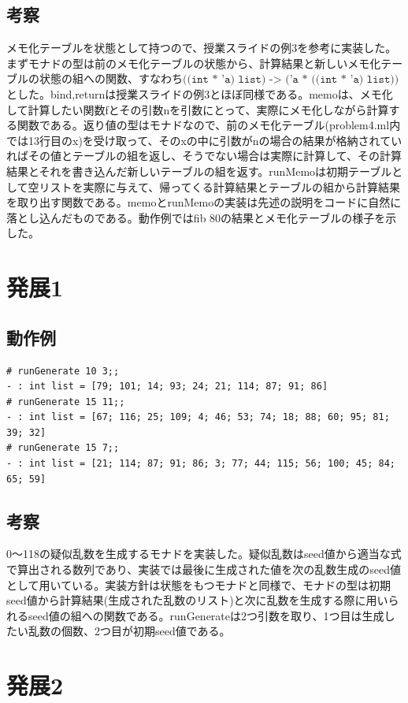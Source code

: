 \documentclass[11pt,a4paper]{jsarticle}
\begin{document}
\subsection*{考察}
メモ化テーブルを状態として持つので、授業スライドの例3を参考に実装した。
まずモナドの型は前のメモ化テーブルの状態から、計算結果と新しいメモ化テーブルの状態の組への関数、すなわち$\texttt{((int * 'a) list) -> ('a * ((int * 'a) list))}$とした。bind,returnは授業スライドの例3とほぼ同様である。memoは、メモ化して計算したい関数fとその引数nを引数にとって、実際にメモ化しながら計算する関数である。返り値の型はモナドなので、前のメモ化テーブル(problem4.ml内では13行目のx)を受け取って、そのxの中に引数がnの場合の結果が格納されていればその値とテーブルの組を返し、そうでない場合は実際に計算して、その計算結果とそれを書き込んだ新しいテーブルの組を返す。runMemoは初期テーブルとして空リストを実際に与えて、帰ってくる計算結果とテーブルの組から計算結果を取り出す関数である。memoとrunMemoの実装は先述の説明をコードに自然に落とし込んだものである。動作例ではfib 80の結果とメモ化テーブルの様子を示した。
\section*{発展1}
\subsection*{動作例}
\begin{lstlisting}[basicstyle=\ttfamily\footnotesize, frame=single]
# runGenerate 10 3;;
- : int list = [79; 101; 14; 93; 24; 21; 114; 87; 91; 86]
# runGenerate 15 11;;
- : int list = [67; 116; 25; 109; 4; 46; 53; 74; 18; 88; 60; 95; 81; 39; 32]
# runGenerate 15 7;;
- : int list = [21; 114; 87; 91; 86; 3; 77; 44; 115; 56; 100; 45; 84; 65; 59]
\end{lstlisting}
\subsection*{考察}
0〜118の疑似乱数を生成するモナドを実装した。疑似乱数はseed値から適当な式で算出される数列であり、実装では最後に生成された値を次の乱数生成のseed値として用いている。実装方針は状態をもつモナドと同様で、モナドの型は初期seed値から計算結果(生成された乱数のリスト)と次に乱数を生成する際に用いられるseed値の組への関数である。runGenerateは2つ引数を取り、1つ目は生成したい乱数の個数、2つ目が初期seed値である。
\section*{発展2}
\end{document}
